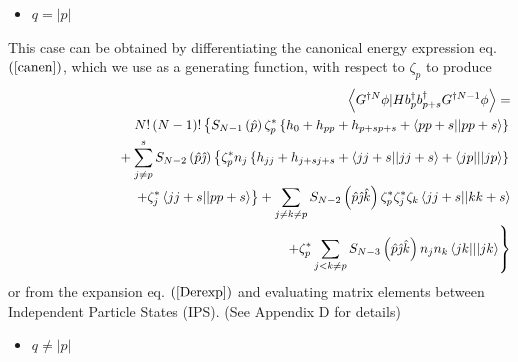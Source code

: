 \documentclass{article}
\begin{document}
\begin{itemize}
\item $q=\left| p\right| $
\end{itemize}

This case can be obtained by differentiating the canonical energy expression
eq. $\left( \ref{canen}\right) $, which we use as a generating function,
with respect to $\zeta _{p}$ to produce 
\begin{eqnarray}
&&\left\langle G^{\dagger N}\phi |Hb_{p}^{\dagger }b_{p+s}^{\dagger
}G^{\dagger N-1}\phi \right\rangle =  \notag \\
&&\qquad \qquad N!\left( N-1\right) !\left\{ S_{N-1}\left( \hat{p}\right)
\zeta _{p}^{\ast }\left\{ h_{0}+h_{pp}+h_{p+sp+s}+\left\langle
pp+s||pp+s\right\rangle \right\} \right.  \notag \\
&&\left. {}\right. \qquad +\sum_{j\neq p}^{s}S_{N-2}\left( \hat{p}\hat{\jmath%
}\right) \left\{ \zeta _{p}^{\ast }n_{j}\left\{
h_{jj}+h_{j+sj+s}+\left\langle jj+s||jj+s\right\rangle +\left\langle
jp|||jp\right\rangle \right\} \right.  \notag \\
&&\left. {}\right. \qquad \qquad \left. +\zeta _{j}^{\ast }\left\langle
jj+s||pp+s\right\rangle \right\} +\sum_{j\neq k\neq p}S_{N-2}\left( \hat{p}%
\hat{\jmath}\hat{k}\right) \zeta _{p}^{\ast }\zeta _{j}^{\ast }\zeta
_{k}\left\langle jj+s||kk+s\right\rangle  \notag \\
&&\qquad \qquad \qquad \qquad \qquad \qquad \qquad \qquad \qquad \qquad
\left. +\zeta _{p}^{\ast }\sum_{j<k\neq p}S_{N-3}\left( \hat{p}\hat{\jmath}%
\hat{k}\right) n_{j}n_{k}\left\langle jk|||jk\right\rangle \right\}
\label{pps}
\end{eqnarray}%
or from the expansion eq. $\left( \ref{Derexp}\right) $ and evaluating
matrix elements between Independent Particle States (IPS). (See Appendix D
for details)

\begin{itemize}
\item $q\neq \left| p\right| $
\end{itemize}
\end{document}
